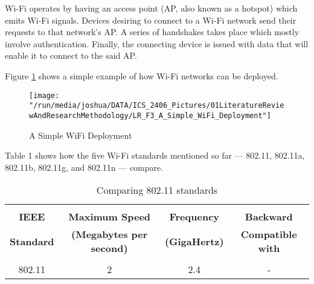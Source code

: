 \documentclass[12pt,svgnames,smaller]{article} %
\begin{document}
\begin{enumerate}
		Wi-Fi operates by having an access point (AP, also known as a hotspot) which emits Wi-Fi signals. Devices desiring to connect to a Wi-Fi network send their requests to that network’s AP. A series of handshakes takes place which mostly involve authentication. Finally, the connecting device is issued with data that will enable it to connect to the said AP. 
		
		Figure \ref{fig:LiteratureReview-Figure3} shows a simple example of how Wi-Fi networks can be deployed. 
		
		\begin{figure}
			\texttt{[image: "/run/media/joshua/DATA/ICS\_2406\_Pictures/01LiteratureReviewAndResearchMethodology/LR\_F3\_A\_Simple\_WiFi\_Deployment"]}
			\caption{A Simple WiFi Deployment}
			\label{fig:LiteratureReview-Figure3}
		\end{figure}
		
		Table 1 shows how the five Wi-Fi standards mentioned so far --- 802.11, 802.11a, 802.11b, 802.11g, and 802.11n --- compare.
		
		\begin{table} [ht]
			
			\centering
			
			\caption{Comparing 802.11 standards}
			
			\begin{tabular}{c | c | c | c}
				
				
				\hline %
				
				& & & \\[-0.5ex] %
				
				\textbf{IEEE} & \textbf{Maximum Speed} & \textbf{Frequency} & \textbf{Backward} \\[1ex]
				\textbf{Standard} & \textbf{(Megabytes per second)} & \textbf{(GigaHertz)} & \textbf{Compatible with} \\[1ex]								
				
				\hline\hline %
				
				
				& & & \\[1ex]
				
				
				802.11 & 2 & 2.4 & - \\
				

\end{tabular}
\end{table}
\end{enumerate}
\end{document}

